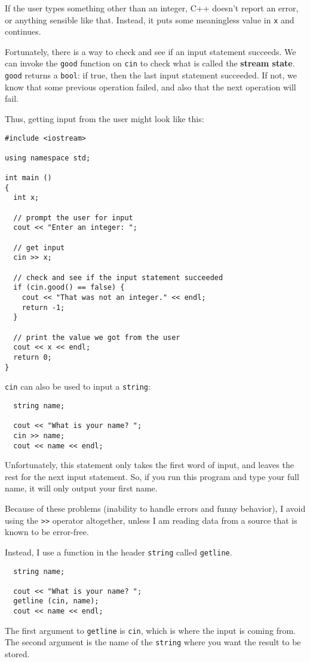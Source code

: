 
If the user types something other than an integer,
C++ doesn't report an error, or anything sensible like that.
Instead, it puts some meaningless value in {\tt x} and continues.

Fortunately, there is a way to check and see if an input
statement succeeds.  We can invoke the {\tt good} function on
{\tt cin} to check what is called the {\bf stream state}.
{\tt good} returns a {\tt bool}: if true, then the last input
statement succeeded.  If not, we know that some previous operation
failed, and also that the next operation will fail.

Thus, getting input from the user might look like this:

\begin{verbatim}
#include <iostream>

using namespace std;

int main ()
{
  int x;

  // prompt the user for input
  cout << "Enter an integer: ";

  // get input
  cin >> x;

  // check and see if the input statement succeeded
  if (cin.good() == false) {
    cout << "That was not an integer." << endl;
    return -1;
  }

  // print the value we got from the user
  cout << x << endl;
  return 0;
}
\end{verbatim}
%
{\tt cin} can also be used to input a {\tt string}:

\begin{verbatim}
  string name;

  cout << "What is your name? ";
  cin >> name;
  cout << name << endl;
\end{verbatim}
%
Unfortunately, this statement only takes the first word of
input, and leaves the rest for the next input statement.
So, if you run this program and type your full name, it
will only output your first name.

Because of these problems (inability to handle errors and
funny behavior), I avoid using the {\tt >>} operator altogether,
unless I am reading data from a source that is known to be
error-free.

Instead, I use a function in the header {\tt string} called {\tt getline}.

\begin{verbatim}
  string name;

  cout << "What is your name? ";
  getline (cin, name);
  cout << name << endl;
\end{verbatim}
%
The first argument to {\tt getline} is {\tt cin}, which is
where the input is coming from.  The second argument is the
name of the {\tt string} where you want the result to be
stored.

